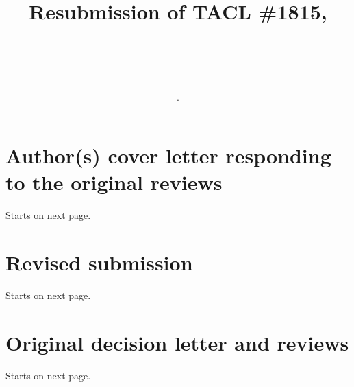 \documentclass{article}[11pt,a4paper,oneside]
\title{Resubmission of TACL \#1815, \\ \subtitle.   \\}
\newcommand{\resubmission}{revised3.pdf}  %
\newcommand{\origdecision}{tacl1815-decision.pdf}  %
\newcommand{\coverfile}{responses.pdf}  %
\begin{document}
\maketitle

\tableofcontents

\section{Author(s) cover letter responding to the original reviews} Starts on next page.

\section{Revised submission} Starts on next page.

\section{Original decision letter and reviews} Starts on next page.

\end{document}
